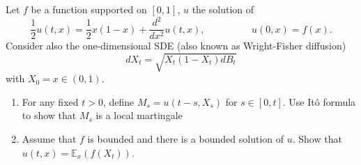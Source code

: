 Let $f$ be a function supported on $[0,1]$, $u$ the solution of 
\[\frac{1}{2}u(t,x)=\frac{1}{2}x(1-x)+\frac{d^2}{dx^2}u(t,x), \hspace{2cm} u(0,x)=f(x).\]
Consider also the one-dimensional SDE (also known as Wright-Fisher diffusion)
\[dX_t=\sqrt{X_t(1-X_t)dB_t}\]
with $X_0=x\in(0,1)$.
\begin{enumerate}
    \item For any fixed $t>0$, define $M_s=u(t-s,X_s)$ for $s\in[0,t]$. Use Itô formula to show that $M_s$ is a local martingale
    \item Assume that $f$ is bounded and there is a bounded solution of $u$. Show that $u(t,x)=\mathbb{E}_x(f(X_t))$.
\end{enumerate}